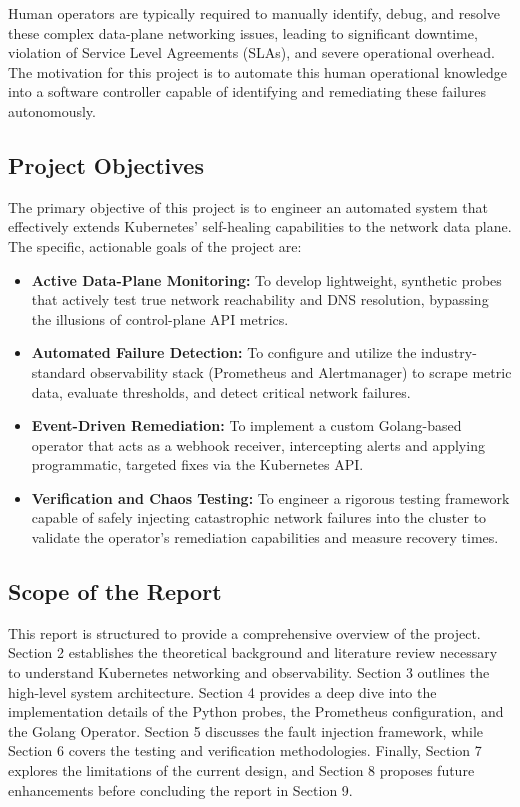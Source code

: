 \documentclass[12pt,a4paper]{article}
\begin{document}
Human operators are typically required to manually identify, debug, and resolve these complex data-plane networking issues, leading to significant downtime, violation of Service Level Agreements (SLAs), and severe operational overhead. The motivation for this project is to automate this human operational knowledge into a software controller capable of identifying and remediating these failures autonomously.

\subsection{Project Objectives}
The primary objective of this project is to engineer an automated system that effectively extends Kubernetes' self-healing capabilities to the network data plane. The specific, actionable goals of the project are:
\begin{itemize}
    \item \textbf{Active Data-Plane Monitoring:} To develop lightweight, synthetic probes that actively test true network reachability and DNS resolution, bypassing the illusions of control-plane API metrics.
    \item \textbf{Automated Failure Detection:} To configure and utilize the industry-standard observability stack (Prometheus and Alertmanager) to scrape metric data, evaluate thresholds, and detect critical network failures.
    \item \textbf{Event-Driven Remediation:} To implement a custom Golang-based operator that acts as a webhook receiver, intercepting alerts and applying programmatic, targeted fixes via the Kubernetes API.
    \item \textbf{Verification and Chaos Testing:} To engineer a rigorous testing framework capable of safely injecting catastrophic network failures into the cluster to validate the operator's remediation capabilities and measure recovery times.
\end{itemize}

\subsection{Scope of the Report}
This report is structured to provide a comprehensive overview of the project. Section 2 establishes the theoretical background and literature review necessary to understand Kubernetes networking and observability. Section 3 outlines the high-level system architecture. Section 4 provides a deep dive into the implementation details of the Python probes, the Prometheus configuration, and the Golang Operator. Section 5 discusses the fault injection framework, while Section 6 covers the testing and verification methodologies. Finally, Section 7 explores the limitations of the current design, and Section 8 proposes future enhancements before concluding the report in Section 9.
\end{document}
